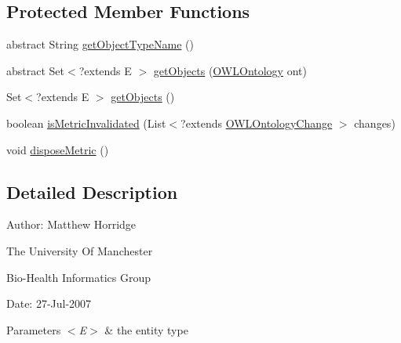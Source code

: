 \subsection*{Protected Member Functions}
\begin{DoxyCompactItemize}
\item 
abstract String \hyperlink{classorg_1_1semanticweb_1_1owlapi_1_1metrics_1_1_object_count_metric_3_01_e_01extends_01_object_01_4_a5aa78d5ef47301ef2ba0c7611ca909f5}{get\-Object\-Type\-Name} ()
\item 
abstract Set$<$?extends E $>$ \hyperlink{classorg_1_1semanticweb_1_1owlapi_1_1metrics_1_1_object_count_metric_3_01_e_01extends_01_object_01_4_ab2456058892ddd987833c07644214aba}{get\-Objects} (\hyperlink{interfaceorg_1_1semanticweb_1_1owlapi_1_1model_1_1_o_w_l_ontology}{O\-W\-L\-Ontology} ont)
\item 
Set$<$?extends E $>$ \hyperlink{classorg_1_1semanticweb_1_1owlapi_1_1metrics_1_1_object_count_metric_3_01_e_01extends_01_object_01_4_ab50d7c949d3a2b543a5f9e88c61ef135}{get\-Objects} ()
\item 
boolean \hyperlink{classorg_1_1semanticweb_1_1owlapi_1_1metrics_1_1_object_count_metric_3_01_e_01extends_01_object_01_4_a656335eaf47f0686ef412f51ee56e0a8}{is\-Metric\-Invalidated} (List$<$?extends \hyperlink{classorg_1_1semanticweb_1_1owlapi_1_1model_1_1_o_w_l_ontology_change}{O\-W\-L\-Ontology\-Change} $>$ changes)
\item 
void \hyperlink{classorg_1_1semanticweb_1_1owlapi_1_1metrics_1_1_object_count_metric_3_01_e_01extends_01_object_01_4_a0798b54122a771a0f1fa44d8e9697a3f}{dispose\-Metric} ()
\end{DoxyCompactItemize}


\subsection{Detailed Description}
Author\-: Matthew Horridge\par
 The University Of Manchester\par
 Bio-\/\-Health Informatics Group\par
 Date\-: 27-\/\-Jul-\/2007\par
 \par



\begin{DoxyParams}{Parameters}
{\em $<$\-E$>$} & the entity type \\
\hline
\end{DoxyParams}


